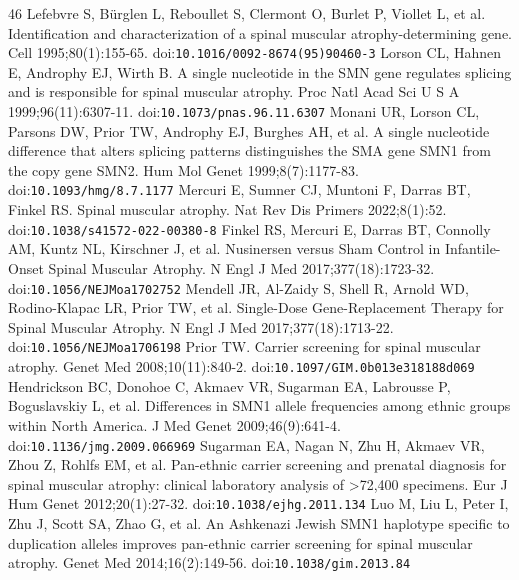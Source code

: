 \providecommand{\url}[1]{\texttt{#1}}\providecommand{\nolinkurl}[1]{\texttt{#1}}
\begin{thebibliography}{46}
 Lefebvre S, Bürglen L, Reboullet S, Clermont O, Burlet P, Viollet L, et al. Identification and characterization of a spinal muscular atrophy-determining gene. Cell 1995;80(1):155-65. doi:\nolinkurl{10.1016/0092-8674(95)90460-3}
 Lorson CL, Hahnen E, Androphy EJ, Wirth B. A single nucleotide in the SMN gene regulates splicing and is responsible for spinal muscular atrophy. Proc Natl Acad Sci U S A 1999;96(11):6307-11. doi:\nolinkurl{10.1073/pnas.96.11.6307}
 Monani UR, Lorson CL, Parsons DW, Prior TW, Androphy EJ, Burghes AH, et al. A single nucleotide difference that alters splicing patterns distinguishes the SMA gene SMN1 from the copy gene SMN2. Hum Mol Genet 1999;8(7):1177-83. doi:\nolinkurl{10.1093/hmg/8.7.1177}
 Mercuri E, Sumner CJ, Muntoni F, Darras BT, Finkel RS. Spinal muscular atrophy. Nat Rev Dis Primers 2022;8(1):52. doi:\nolinkurl{10.1038/s41572-022-00380-8}
 Finkel RS, Mercuri E, Darras BT, Connolly AM, Kuntz NL, Kirschner J, et al. Nusinersen versus Sham Control in Infantile-Onset Spinal Muscular Atrophy. N Engl J Med 2017;377(18):1723-32. doi:\nolinkurl{10.1056/NEJMoa1702752}
 Mendell JR, Al-Zaidy S, Shell R, Arnold WD, Rodino-Klapac LR, Prior TW, et al. Single-Dose Gene-Replacement Therapy for Spinal Muscular Atrophy. N Engl J Med 2017;377(18):1713-22. doi:\nolinkurl{10.1056/NEJMoa1706198}
 Prior TW. Carrier screening for spinal muscular atrophy. Genet Med 2008;10(11):840-2. doi:\nolinkurl{10.1097/GIM.0b013e318188d069}
 Hendrickson BC, Donohoe C, Akmaev VR, Sugarman EA, Labrousse P, Boguslavskiy L, et al. Differences in SMN1 allele frequencies among ethnic groups within North America. J Med Genet 2009;46(9):641-4. doi:\nolinkurl{10.1136/jmg.2009.066969}
 Sugarman EA, Nagan N, Zhu H, Akmaev VR, Zhou Z, Rohlfs EM, et al. Pan-ethnic carrier screening and prenatal diagnosis for spinal muscular atrophy: clinical laboratory analysis of >72,400 specimens. Eur J Hum Genet 2012;20(1):27-32. doi:\nolinkurl{10.1038/ejhg.2011.134}
 Luo M, Liu L, Peter I, Zhu J, Scott SA, Zhao G, et al. An Ashkenazi Jewish SMN1 haplotype specific to duplication alleles improves pan-ethnic carrier screening for spinal muscular atrophy. Genet Med 2014;16(2):149-56. doi:\nolinkurl{10.1038/gim.2013.84}

\end{thebibliography}
